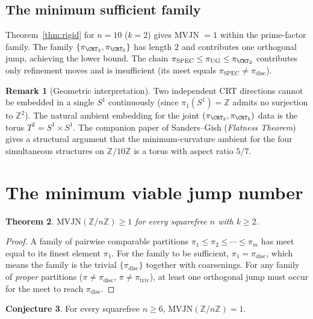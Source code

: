 \documentclass[11pt,reqno]{amsart}
\theoremstyle{plain}
\newtheorem{theorem}{Theorem}
\theoremstyle{definition}
\newtheorem{remark}[theorem]{Remark}
\newtheorem{conjecture}[theorem]{Conjecture}
\newcommand{\Z}{\mathbb{Z}}
\newcommand{\Zn}{\Z/n\Z}
\newcommand{\disc}{\mathrm{disc}}
\newcommand{\triv}{\mathrm{triv}}
\newcommand{\SPEC}{\mathrm{SPEC}}
\newcommand{\UG}{\mathrm{UG}}
\begin{document}
\subsection{The minimum sufficient family}

Theorem~\ref{thm:rigid} for $n = 10$ ($k = 2$) gives MVJN $= 1$ within the prime-factor family. The family $\{\pi_{\CRT_2}, \pi_{\CRT_5}\}$ has length $2$ and contributes one orthogonal jump, achieving the lower bound. The chain $\pi_{\SPEC} \leq \pi_{\UG} \leq \pi_{\CRT_2}$ contributes only refinement moves and is insufficient (its meet equals $\pi_{\SPEC} \neq \pi_{\disc}$).

\begin{remark}[Geometric interpretation]
Two independent CRT directions cannot be embedded in a single $S^1$ continuously (since $\pi_1(S^1) = \Z$ admits no surjection to $\Z^2$). The natural ambient embedding for the joint $(\pi_{\CRT_2}, \pi_{\CRT_5})$ data is the torus $T^2 = S^1 \times S^1$. The companion paper of Sanders--Gish (\emph{Flatness Theorem}) gives a structural argument that the minimum-curvature ambient for the four simultaneous structures on $\Z/10\Z$ is a torus with aspect ratio $5/7$.
\end{remark}

\section{The minimum viable jump number} \label{sec:MVJN}

\begin{theorem} \label{thm:mvjn-lower}
$\mathrm{MVJN}(\Zn) \geq 1$ for every squarefree $n$ with $k \geq 2$.
\end{theorem}

\begin{proof}
A family of pairwise comparable partitions $\pi_1 \leq \pi_2 \leq \cdots \leq \pi_m$ has meet equal to its finest element $\pi_1$. For the family to be sufficient, $\pi_1 = \pi_{\disc}$, which means the family is the trivial $\{\pi_{\disc}\}$ together with coarsenings. For any family of \emph{proper} partitions ($\pi \neq \pi_{\disc}$, $\pi \neq \pi_{\triv}$), at least one orthogonal jump must occur for the meet to reach $\pi_{\disc}$.
\end{proof}

\begin{conjecture} \label{conj:MVJN}
For every squarefree $n \geq 6$, $\mathrm{MVJN}(\Zn) = 1$.
\end{conjecture}
\end{document}
